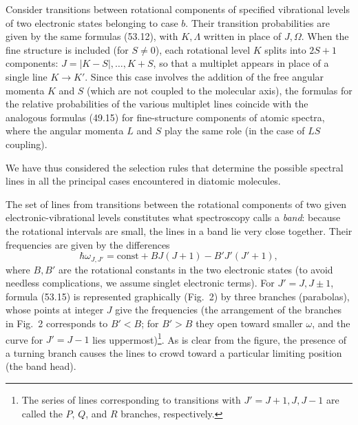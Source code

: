 Consider transitions between rotational components of specified vibrational levels of two electronic states belonging to case $b$. Their transition probabilities are given by the same formulas (53.12), with $K,\Lambda$ written in place of $J,\Omega$. When the fine structure is included (for $S\ne0$), each rotational level $K$ splits into $2S+1$ components: $J=|K-S|,\ldots,K+S$, so that a multiplet appears in place of a single line $K\to K'$. Since this case involves the addition of the free angular momenta $K$ and $S$ (which are not coupled to the molecular axis), the formulas for the relative probabilities of the various multiplet lines coincide with the analogous formulas (49.15) for fine-structure components of atomic spectra, where the angular momenta $L$ and $S$ play the same role (in the case of $LS$ coupling).

We have thus considered the selection rules that determine the possible spectral lines in all the principal cases encountered in diatomic molecules.

The set of lines from transitions between the rotational components of two given electronic-vibrational levels constitutes what spectroscopy calls a \emph{band}: because the rotational intervals are small, the lines in a band lie very close together. Their frequencies are given by the differences
\begin{equation}
\hbar\omega_{J,J'}=\mathrm{const}+BJ(J+1)-B'J'(J'+1),
\tag{53.15}
\end{equation}
where $B,B'$ are the rotational constants in the two electronic states (to avoid needless complications, we assume singlet electronic terms). For $J'=J,J\pm1$, formula (53.15) is represented graphically (Fig.~2) by three branches (parabolas), whose points at integer $J$ give the frequencies (the arrangement of the branches in Fig.~2 corresponds to $B'<B$; for $B'>B$ they open toward smaller $\omega$, and the curve for $J'=J-1$ lies uppermost)\footnote{The series of lines corresponding to transitions with $J'=J+1,J,J-1$ are called the $P$, $Q$, and $R$ branches, respectively.}. As is clear from the figure, the presence of a turning branch causes the lines to crowd toward a particular limiting position (the band head).


